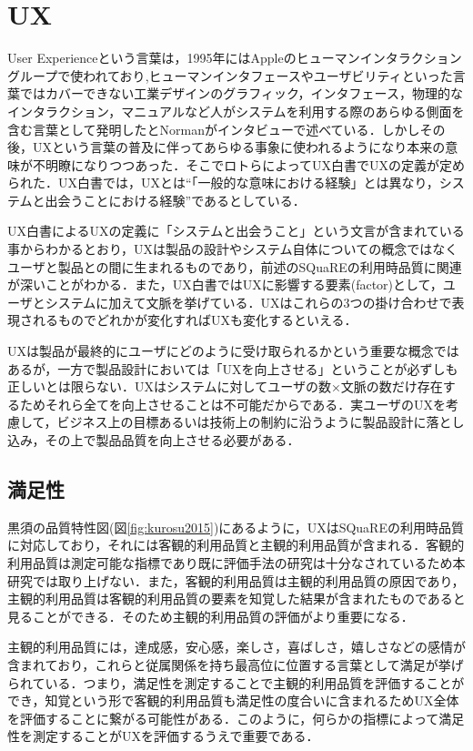 \section{UX}

User Experienceという言葉は，1995年にはAppleのヒューマンインタラクショングループで使われており\cite{norman1995},ヒューマンインタフェースやユーザビリティといった言葉ではカバーできない工業デザインのグラフィック，インタフェース，物理的なインタラクション，マニュアルなど人がシステムを利用する際のあらゆる側面を含む言葉として発明したとNormanがインタビューで述べている\cite{normaninterview}．しかしその後，UXという言葉の普及に伴ってあらゆる事象に使われるようになり本来の意味が不明瞭になりつつあった．そこでロトらによってUX白書でUXの定義が定められた．UX白書では，UXとは``「一般的な意味における経験」とは異なり，システムと出会うことにおける経験''であるとしている\cite{uxwhitepaper}．

UX白書によるUXの定義に「システムと出会うこと」という文言が含まれている事からわかるとおり，UXは製品の設計やシステム自体についての概念ではなくユーザと製品との間に生まれるものであり，前述のSQuaREの利用時品質に関連が深いことがわかる．また，UX白書ではUXに影響する要素(factor)として，ユーザとシステムに加えて文脈を挙げている\cite{uxwhitepaper}．UXはこれらの3つの掛け合わせで表現されるものでどれかが変化すればUXも変化するといえる．

UXは製品が最終的にユーザにどのように受け取られるかという重要な概念ではあるが，一方で製品設計においては「UXを向上させる」ということが必ずしも正しいとは限らない．UXはシステムに対してユーザの数×文脈の数だけ存在するためそれら全てを向上させることは不可能だからである．実ユーザのUXを考慮して，ビジネス上の目標あるいは技術上の制約に沿うように製品設計に落とし込み，その上で製品品質を向上させる必要がある．

\subsection{満足性}

黒須の品質特性図(図\ref{fig:kurosu2015})にあるように，UXはSQuaREの利用時品質に対応しており，それには客観的利用品質と主観的利用品質が含まれる．客観的利用品質は測定可能な指標であり既に評価手法の研究は十分なされているため本研究では取り上げない．また，客観的利用品質は主観的利用品質の原因であり，主観的利用品質は客観的利用品質の要素を知覚した結果が含まれたものであると見ることができる．そのため主観的利用品質の評価がより重要になる．

主観的利用品質には，達成感，安心感，楽しさ，喜ばしさ，嬉しさなどの感情が含まれており，これらと従属関係を持ち最高位に位置する言葉として満足が挙げられている\cite{kurosu2011}．つまり，満足性を測定することで主観的利用品質を評価することができ，知覚という形で客観的利用品質も満足性の度合いに含まれるためUX全体を評価することに繋がる可能性がある．このように，何らかの指標によって満足性を測定することがUXを評価するうえで重要である．

